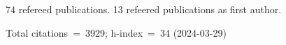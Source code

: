 74 refereed publications. 13 refeered publications as first author.

Total citations~=~3929; h-index~=~34 (2024-03-29)